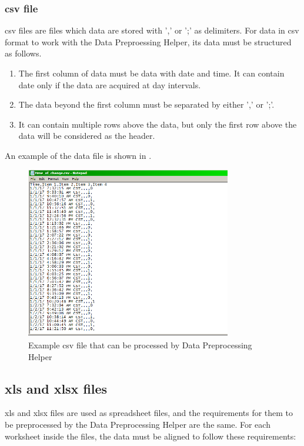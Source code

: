 \documentclass[12pt,a4paper]{article}
\begin{document}
\subsubsection{csv file}
\label{sec:csv-file}
csv files are files which data are stored with ',' or ';' as delimiters. For data in csv format to work with the Data Preproessing Helper, its data must be structured as follows.

\begin{enumerate}
\item The first column of data must be data with date and time. It can contain date only if the data are acquired at day intervals.
\item The data beyond the first column must be separated by either ',' or ';'.
\item It can contain multiple rows above the data, but only the first row above the data will be considered as the header.
\end{enumerate}

An example of the data file is shown in .

\begin{figure}[H]
\centering
\includegraphics[width=0.8\textwidth]{csv-file.png}
\caption{Example csv file that can be processed by Data Preprocessing Helper}
\label{fig:csv_file}
\end{figure}

\subsection{xls and xlsx files}
xls and xlsx files are used as spreadsheet files, and the requirements for them to be preprocessed by the Data Preprocessing Helper are the same. For each worksheet inside the files, the data must be aligned to follow these requirements:
\end{document}
